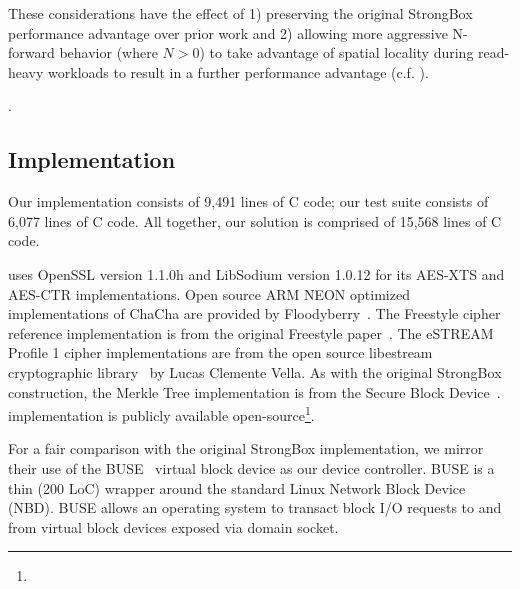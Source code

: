 These considerations have the effect of 1) preserving the original StrongBox
performance advantage over prior work and 2) allowing more aggressive N-forward
behavior (where $N > 0$) to take advantage of spatial locality during read-heavy
workloads to result in a further performance advantage (c.f.
).

.

\subsection{Implementation}

Our \SYSTEM{} implementation consists of 9,491 lines of C code; our test suite
consists of 6,077 lines of C code. All together, our solution is comprised of
15,568 lines of C code.

\SYSTEM{} uses OpenSSL version 1.1.0h and LibSodium version 1.0.12 for its
AES-XTS and AES-CTR implementations. Open source ARM NEON optimized
implementations of ChaCha are provided by Floodyberry~\cite{Floodyberry}. The
Freestyle cipher reference implementation is from the original Freestyle
paper~\cite{Freestyle}. The eSTREAM Profile 1 cipher implementations are from
the open source libestream cryptographic library~\cite{libestream} by Lucas
Clemente Vella. As with the original StrongBox construction, the Merkle Tree
implementation is from the Secure Block Device~\cite{SBD}. \SYSTEM{}
implementation is publicly available open-source\footnote{\SystemURI}.

For a fair comparison with the original StrongBox implementation, we mirror
their use of the BUSE~\cite{BUSE} virtual block device as our device controller.
BUSE is a thin (200 LoC) wrapper around the standard Linux Network Block Device
(NBD). BUSE allows an operating system to transact block I/O requests to and
from virtual block devices exposed via domain socket.

